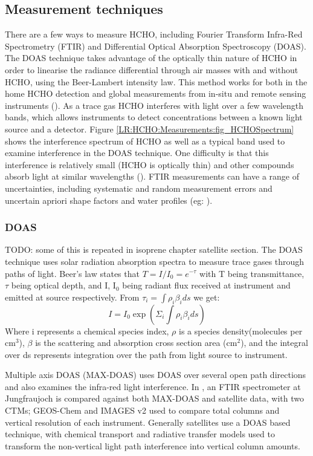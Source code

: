   \subsection{Measurement techniques}
  \label{LR:HCHO:Measurements}
    There are a few ways to measure HCHO, including Fourier Transform Infra-Red Spectrometry (FTIR) and Differential Optical Absorption Spectroscopy (DOAS).
    The DOAS technique takes advantage of the optically thin nature of HCHO in order to linearise the radiance differential through air masses with and without HCHO, using the Beer-Lambert intensity law.
    This method works for both in the home HCHO detection and global measurements from in-situ and remote sensing instruments (\cite{Guenther1995, Abad2015, Davenport2015}).
    As a trace gas HCHO interferes with light over a few wavelength bands, which allows instruments to detect concentrations between a known light source and a detector.
    Figure \ref{LR:HCHO:Measurements:fig_HCHOSpectrum} shows the interference spectrum of HCHO as well as a typical band used to examine interference in the DOAS technique.
    One difficulty is that this interference is relatively small (HCHO is optically thin) and other compounds absorb light at similar wavelengths (\cite{Davenport2015}).
    FTIR measurements can have a range of uncertainties, including systematic and random measurement errors and uncertain apriori shape factors and water profiles (eg: \cite{Franco2015}).
    
    \subsubsection{DOAS}
    TODO: some of this is repeated in isoprene chapter satellite section.
    The DOAS technique uses solar radiation absorption spectra to measure trace gases through paths of light.
    Beer's law states that $ T = I/I_0 = e^{-\tau} $ with T being transmittance, $\tau$ being optical depth, and I, I$_0$ being radiant flux received at instrument and emitted at source respectively.
    From $ \tau_i = \int \rho_i \beta_i ds $ we get:
    $$ I = I_0 \exp {\left( \Sigma_i \int \rho_i \beta_i ds \right) } $$
    Where i represents a chemical species index, $\rho$ is a species density(molecules per cm$^3$), $\beta$ is the scattering and absorption cross section area (cm$^2$), and the integral over ds represents integration over the path from light source to instrument.
    
    Multiple axis DOAS (MAX-DOAS) uses DOAS over several open path directions and also examines the infra-red light interference.
    In \cite{Franco2015}, an FTIR spectrometer at Jungfraujoch is compared against both MAX-DOAS and satellite data, with two CTMs; GEOS-Chem and IMAGES v2 used to compare total columns and vertical resolution of each instrument.
    Generally satellites use a DOAS based technique, with chemical transport and radiative transfer models used to transform the non-vertical light path interference into vertical column amounts.
    
